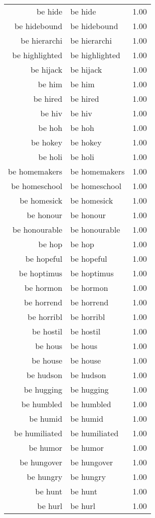 \begin{table}[ht]
\begin{tabular}{rlr}
  be hide & be hide & 1.00 \\ 
  be hidebound & be hidebound & 1.00 \\ 
  be hierarchi & be hierarchi & 1.00 \\ 
  be highlighted & be highlighted & 1.00 \\ 
  be hijack & be hijack & 1.00 \\ 
  be him & be him & 1.00 \\ 
  be hired & be hired & 1.00 \\ 
  be hiv & be hiv & 1.00 \\ 
  be hoh & be hoh & 1.00 \\ 
  be hokey & be hokey & 1.00 \\ 
  be holi & be holi & 1.00 \\ 
  be homemakers & be homemakers & 1.00 \\ 
  be homeschool & be homeschool & 1.00 \\ 
  be homesick & be homesick & 1.00 \\ 
  be honour & be honour & 1.00 \\ 
  be honourable & be honourable & 1.00 \\ 
  be hop & be hop & 1.00 \\ 
  be hopeful & be hopeful & 1.00 \\ 
  be hoptimus & be hoptimus & 1.00 \\ 
  be hormon & be hormon & 1.00 \\ 
  be horrend & be horrend & 1.00 \\ 
  be horribl & be horribl & 1.00 \\ 
  be hostil & be hostil & 1.00 \\ 
  be hous & be hous & 1.00 \\ 
  be house & be house & 1.00 \\ 
  be hudson & be hudson & 1.00 \\ 
  be hugging & be hugging & 1.00 \\ 
  be humbled & be humbled & 1.00 \\ 
  be humid & be humid & 1.00 \\ 
  be humiliated & be humiliated & 1.00 \\ 
  be humor & be humor & 1.00 \\ 
  be hungover & be hungover & 1.00 \\ 
  be hungry & be hungry & 1.00 \\ 
  be hunt & be hunt & 1.00 \\ 
  be hurl & be hurl & 1.00 \\ 

\end{tabular}
\end{table}

